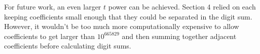 \documentclass{amsart}
\newcommand{\ME}{{665829}}
\numberwithin{equation}{section}
\theoremstyle{plain} %
\theoremstyle{definition}
\theoremstyle{remark}
\begin{document}
For future work, an even larger $t$ power can be achieved. Section 4 relied on each keeping coefficients small enough that they could be separated in the digit sum. However, it wouldn't be too much more computationally expensive to allow coefficients to get larger than $10^\ME$ and then summing together adjacent coefficients before calculating digit sums. 




 
















\end{document}

